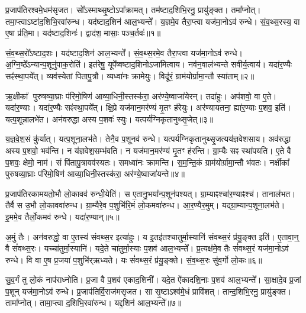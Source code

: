 प्र॒जाप॑तिरश्वमे॒धम॑सृजत।
सो᳚ऽस्माथ्सृ॒ष्टो\-ऽपा᳚क्रामत्।
तम॑ष्टाद॒शिभि॒रनु॒ प्रायु॑ङ्क्त।
तमा᳚प्नोत्।
तमा॒प्त्वा\-ऽष्टा॑द॒शिभि॒रवा॑\-रुन्ध।
यद॑ष्टाद॒शिन॑ आल॒भ्यन्ते᳚।
य॒ज्ञमे॒व तैरा॒प्त्वा यज॑मा॒नो\-ऽव॑ रुन्धे।
सं॒व॒थ्स॒रस्य॒ वा ए॒षा प्र॑ति॒मा।
यद॑ष्टाद॒शिनः॑।
द्वाद॑श॒ मासाः॒ पञ्च॒र्तवः॑॥१॥

सं॒व॒थ्स॒रो᳚\-ऽष्टाद॒शः।
यद॑ष्टाद॒शिन॑ आल॒भ्यन्ते᳚।
सं॒व॒थ्स॒रमे॒व तैरा॒प्त्वा यज॑मा॒नो\-ऽव॑ रुन्धे।
अ॒ग्नि॒ष्ठे᳚\-ऽन्यान्प॒शूनु॑पाक॒रोति॑।
इत॑रेषु॒ यूपे᳚ष्वष्टाद॒शिनो\-ऽजा॑मित्वाय।
नव॑न॒वाल॑भ्यन्ते सवीर्य॒त्वाय॑।
यदा॑र॒ण्यैः सꣴ॑स्था॒पये᳚त्।
व्यव॑स्येतां पितापु॒त्रौ।
व्यध्वा॑नः क्रामेयुः।
विदू॑रं॒ ग्राम॑योर्ग्रामा॒न्तौ स्या॑ताम्॥२॥

ऋ॒क्षीका᳚ पुरुषव्या॒घ्राः प॑रिमो॒षिण॑ आव्या॒धिनी॒स्तस्क॑रा॒ अर॑ण्ये॒ष्वाजा॑येरन्।
तदा॑हुः।
अप॑शवो॒ वा ए॒ते।
यदा॑र॒ण्याः।
यदा॑र॒ण्यैः सꣴ॑स्था॒पये᳚त्।
क्षि॒प्रे यज॑मान॒मर॑ण्यं मृ॒तꣳ ह॑रेयुः।
अर॑ण्यायतना॒ ह्या॑र॒ण्याः प॒शव॒ इति॑।
यत्प॒शून्नालभे॑त।
अन॑वरुद्धा अस्य प॒शवः॑ स्युः।
यत्पर्य॑ग्निकृतानुथ्सृ॒जेत्॥३॥

य॒ज्ञ॒वे॒श॒सं कु॑र्यात्।
यत्प॒शूना॒लभ॑ते।
तेनै॒व प॒शूनव॑ रुन्धे।
यत्पर्य॑ग्निकृतानुथ्सृ॒जत्यय॑ज्ञवेशसाय।
अव॑रुद्धा अस्य प॒शवो॒ भव॑न्ति।
न य॑ज्ञवेश॒सम्भ॑वति।
न यज॑मान॒मर॑ण्यं मृ॒तꣳ ह॑रन्ति।
ग्रा॒म्यैः सꣴ स्था॑पयति।
ए॒ते वै प॒शवः॒ क्षेमो॒ नाम॑।
सं पि॑तापु॒त्रावव॑स्यतः।
समध्वा॑नः क्रामन्ति।
स॒म॒न्ति॒कं ग्राम॑योर्ग्रामा॒न्तौ भ॑वतः।
नर्क्षीका᳚ पुरुषव्या॒घ्राः प॑रिमो॒षिण॑ आव्या॒धिनी॒स्तस्क॑रा॒ अर॑ण्ये॒ष्वाजा॑यन्ते॥४॥\anuvakamend[ऋ॒तवः॑ स्यातामुथ्सृ॒जेथ्स्य॑त॒स्त्रीणि॑ च]

प्र॒जाप॑तिरकामयतो॒भौ लो॒कावव॑ रुन्धी॒येति॑।
स ए॒तानु॒भया᳚न्प॒शून॑पश्यत्।
ग्रा॒म्याꣴश्चा॑र॒ण्याꣴश्च॑।
तानाल॑भत।
तैर्वै स उ॒भौ लो॒काववा॑रुन्ध।
ग्रा॒म्यैरे॒व प॒शुभि॑रि॒मं लो॒कमवा॑रुन्ध।
आ॒र॒ण्यैर॒मुम्।
यद्ग्रा॒म्यान्प॒शूना॒लभ॑ते।
इ॒ममे॒व तैर्लो॒कमव॑ रुन्धे।
यदा॑र॒ण्यान्॥५॥

अ॒मुं तैः।
अन॑वरुद्धो॒ वा ए॒तस्य॑ संवथ्स॒र इत्या॑हुः।
य इ॒तइ॑तश्चातुर्मा॒स्यानि॑ संवथ्स॒रं प्र॑यु॒ङ्क्त इति॑।
ए॒तावा॒न्॒ वै सं॑वथ्स॒रः।
यच्चा॑तुर्मा॒स्यानि॑।
यदे॒ते चा॑तुर्मा॒स्याः प॒शव॑ आल॒भ्यन्ते᳚।
प्र॒त्यक्ष॑मे॒व तैः सं॑वथ्स॒रं यज॑मा॒नो\-ऽव॑ रुन्धे।
वि वा ए॒ष प्र॒जया॑ प॒शुभि॑र्‌\mbox{}ऋध्यते।
यः सं॑वथ्स॒रं प्र॑यु॒ङ्क्ते।
सं॒व॒थ्स॒रः सु॑व॒र्गो लो॒कः॥६॥

सु॒व॒र्गं तु लो॒कं नाप॑राध्नोति।
प्र॒जा वै प॒शव॑ एकाद॒शिनी᳚।
यदे॒त ऐ॑कादशि॒नाः प॒शव॑ आल॒भ्यन्ते᳚।
सा॒क्षादे॒व प्र॒जां प॒शून् यज॑मा॒नो\-ऽव॑ रुन्धे।
प्र॒जाप॑तिर्वि॒राज॑मसृजत।
सा सृ॒ष्टा\-ऽश्व॑मे॒धं प्रावि॑शत्।
तान्द॒शिभि॒रनु॒ प्रायु॑ङ्क्त।
तामा᳚प्नोत्।
तामा॒प्त्वा द॒शिभि॒रवा॑रुन्ध।
यद्द॒शिन॑ आल॒भ्यन्ते᳚॥७॥

